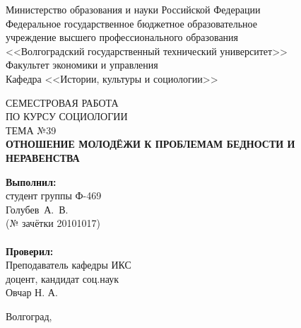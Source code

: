 \begin{titlepage}
    \begin{center}
        Министерство образования и науки Российской Федерации \\
        Федеральное государственное бюджетное образовательное \\
        учреждение высшего профессионального образования \\
        <<Волгоградский государственный технический университет>> \\
        Факультет экономики и управления \\
        Кафедра <<Истории, культуры и социологии>>
    \end{center}
    \vspace{9em}
    \begin{center}
        СЕМЕСТРОВАЯ РАБОТА \\
        ПО КУРСУ СОЦИОЛОГИИ \\
        ТЕМА №39 \\
        \textbf{ОТНОШЕНИЕ МОЛОДЁЖИ К ПРОБЛЕМАМ БЕДНОСТИ И НЕРАВЕНСТВА}
    \end{center}
    \vspace{1em}
    \begin{flushright}
        \begin{minipage}{.40\textwidth}
            \textbf{Выполнил:} \\
            студент группы Ф-469 \\
            Голубев~А.~В. \\
            (№ зачётки 20101017) \\
            \vspace{1em} \\
            \textbf{Проверил:} \\
            Преподаватель кафедры ИКС \\
            доцент, кандидат соц.наук \\
            Овчар Н. А.
        \end{minipage}
    \end{flushright}
    \vspace{\fill}
    \begin{center}
        Волгоград, \the\year
    \end{center}
\end{titlepage}